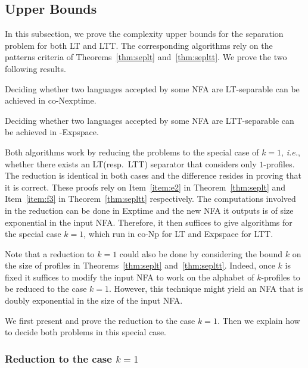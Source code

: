 \documentclass{LMCS}
\newcommand{\lt}{\textup{LT}\xspace}
\newcommand{\ltt}{\textup{LTT}\xspace}
\newcommand\profiles[1]{$#1$-profiles\xspace}
\newcommand\kprofiles{\profiles{k}}
\theoremstyle{plain}
\begin{document}
\subsection{Upper Bounds}

\makeatletter{}In this subsection, we prove the complexity upper bounds for the
separation problem for both \lt and
\ltt. The corresponding algorithms rely on the patterns criteria of
Theorems~\ref{thm:seplt} and~\ref{thm:sepltt}. We prove the two
following results.

\begin{prop} \label{prop:ult}
 Deciding whether two languages accepted by some NFA
 are \lt-separable can be achieved in {\sc co-Nexptime}.
\end{prop}

\begin{prop} \label{prop:ultt}
  Deciding whether two languages accepted by some NFA
  are \ltt-separable can be achieved in {-Expspace}.
\end{prop}

Both algorithms work by reducing the problems to the special case
of $k=1$, \emph{i.e.}, whether there exists an \lt (resp.~\ltt) separator
that considers only \profiles{1}. The reduction is identical in both
cases and the difference resides in proving that it is correct. These
proofs rely on Item~\eqref{item:e2} in Theorem~\ref{thm:seplt} and
Item~\eqref{item:f3} in Theorem~\ref{thm:sepltt} respectively. The
computations involved in the reduction can be done in {\sc Exptime}
and the new NFA it outputs is of size exponential in the input NFA.
Therefore, it then suffices to give algorithms for the special case
$k=1$, which run in {\sc co-Np} for \lt and {\sc Expspace} for \ltt.

Note that a reduction to $k=1$ could also be done by considering
the bound $k$ on the size of profiles in Theorems~\ref{thm:seplt}
and~\ref{thm:sepltt}. Indeed, once $k$ is fixed it suffices to modify
the input NFA to work on the alphabet of \kprofiles to be reduced to
the case $k=1$. However, this technique might yield an NFA that
is doubly exponential in the size of the input NFA.

We first present and prove the reduction to the case $k=1$. Then we
explain how to decide both problems in this special case.

\subsubsection{Reduction to the case $k=1$}
\label{sec:reduction-case-k=1}
\end{document}
